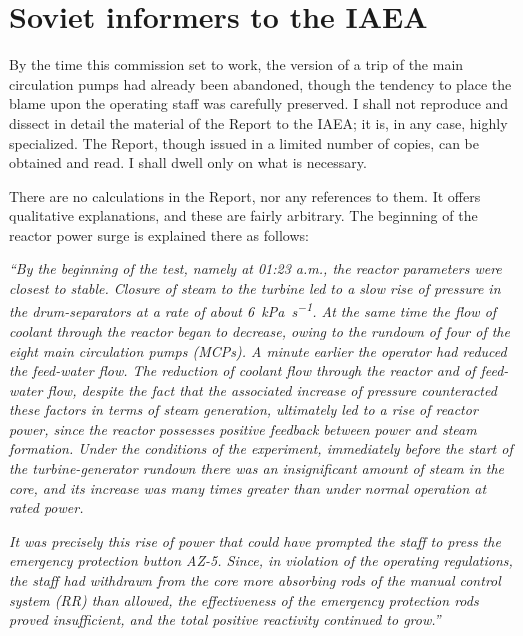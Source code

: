 \documentclass[openright]{bookest}
\begin{document}
\section{Soviet informers to the IAEA}

By the time this commission set to work, the version of a trip of the main circulation pumps had already been abandoned, though the tendency to place the blame upon the operating staff was carefully preserved. I shall not reproduce and dissect in detail the material of the Report to the IAEA; it is, in any case, highly specialized. The Report, though issued in a limited number of copies, can be obtained and read. I shall dwell only on what is necessary.

There are no calculations in the Report, nor any references to them. It offers qualitative explanations, and these are fairly arbitrary. The beginning of the reactor power surge is explained there as follows:

\begin{personal}
\textit{``By the beginning of the test, namely at 01:23 a.m., the reactor parameters were closest to stable. Closure of steam to the turbine led to a slow rise of pressure in the drum-separators at a rate of about \qty{6}{\kilo\pascal\per\second}. At the same time the flow of coolant through the reactor began to decrease, owing to the rundown of four of the eight main circulation pumps (MCPs). A minute earlier the operator had reduced the feed-water flow. The reduction of coolant flow through the reactor and of feed-water flow, despite the fact that the associated increase of pressure counteracted these factors in terms of steam generation, ultimately led to a rise of reactor power, since the reactor possesses positive feedback between power and steam formation. Under the conditions of the experiment, immediately before the start of the turbine-generator rundown there was an insignificant amount of steam in the core, and its increase was many times greater than under normal operation at rated power.}

\textit{It was precisely this rise of power that could have prompted the staff to press the emergency protection button AZ-5. Since, in violation of the operating regulations, the staff had withdrawn from the core more absorbing rods of the manual control system (RR) than allowed, the effectiveness of the emergency protection rods proved insufficient, and the total positive reactivity continued to grow.''}
\end{personal}
\end{document}
